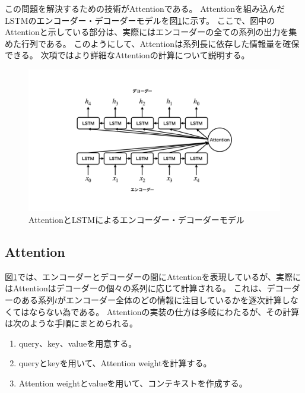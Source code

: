 この問題を解決するための技術がAttentionである。
Attentionを組み込んだLSTMのエンコーダー・デコーダーモデルを図\ref{19EncoderDecoderAttention}に示す。
ここで、図中のAttentionと示している部分は、実際にはエンコーダーの全ての系列の出力を集めた行列である。
このようにして、Attentionは系列長に依存した情報量を確保できる。
次項ではより詳細なAttentionの計算について説明する。

\begin{figure}[h]
 \centering
 \includegraphics[trim = 100 100 100 100, width=1.0\textwidth, clip]{Figure/2DeepLearning/19EncoderDecoderAttention.png}
 \caption{AttentionとLSTMによるエンコーダー・デコーダーモデル}
 \label{19EncoderDecoderAttention}
\end{figure}


\subsection{Attention} \label{DL:Atten:Attention}

図\ref{19EncoderDecoderAttention}では、エンコーダーとデコーダーの間にAttentionを表現しているが、実際にはAttentionはデコーダーの個々の系列に応じて計算される。
これは、デコーダーのある系列$t$がエンコーダー全体のどの情報に注目しているかを逐次計算しなくてはならない為である。
Attentionの実装の仕方は多岐にわたるが、その計算は次のような手順にまとめられる。

\begin{enumerate}
  \item query、key、valueを用意する。
  \item queryとkeyを用いて、Attention weightを計算する。
  \item Attention weightとvalueを用いて、コンテキストを作成する。
\end{enumerate}

